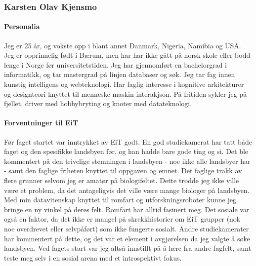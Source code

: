 \subsubsection{Karsten Olav Kjensmo}

\paragraph{Personalia}
Jeg er 25 år, og vokste opp i blant annet Danmark, Nigeria, Namibia og USA. Jeg er opprinnelig født i Bærum, men har har ikke gått på norsk skole eller bodd lenge i Norge før universitetstiden. Jeg har gjennomført en bachelorgrad i informatikk, og tar mastergrad på linjen databaser og søk. Jeg tar fag innen kunstig intelligens og webteknologi. Har faglig interesse i kognitive arkitekturer og designteori knyttet til menneske-maskin-interakjson. På fritiden sykler jeg på fjellet, driver med hobbybryting og knoter med datateknologi. 

\paragraph{Forventninger til EiT}
Før faget startet var inntrykket av EiT godt. En god studiekamerat har tatt både faget og den spesifikke landsbyen før, og han hadde bare gode ting og si. Det ble kommentert på den trivelige stemningen i landsbyen - noe ikke alle landsbyer har - samt den faglige friheten knyttet til oppgaven og emnet. Det faglige trakk av flere grunner  selvom jeg er amatør på biologifeltet. Dette trodde jeg ikke ville være et problem, da det antageligvis det ville være mange biologer på landsbyen.  Med min datavitenskap knyttet til romfart og utforskningsroboter kunne jeg bringe en ny vinkel på deres felt. Romfart har alltid fasinert meg. Det sosiale var også en faktor, da det ikke er mangel på skrekkhistorier om EiT grupper (nok noe overdrevet eller selvpåført) som ikke fungerte sosialt. Andre studiekamerater har kommentert på dette, og det var et element i avgjørelsen da jeg valgte å søke landsbyen. Ved fagets start var jeg altså innstillt på å lære fra andre fagfelt, samt teste meg selv i en sosial arena med et introspektivt fokus. 
